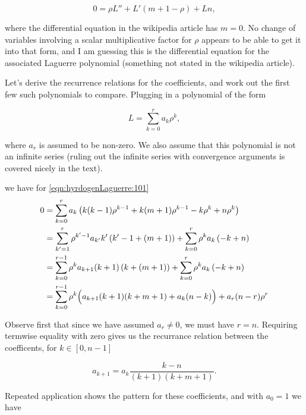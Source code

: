 \begin{equation}\label{eqn:hyrdogenLaguerre:101}
0 =
\rho L''
+L' \left( m + 1 -\rho \right)
+L n,
\end{equation}

where the differential equation in the wikipedia article has $m=0$.  No change of variables involving a scalar multiplicative factor for $\rho$ appears to be able to get it into that form, and I am guessing this is the differential equation for the associated Laguerre polynomial (something not stated in the wikipedia article).

Let's derive the recurrence relations for the coefficients, and work out the first few such polynomials to compare.  Plugging in a polynomial of the form

\begin{equation}\label{eqn:hyrdogenLaguerre:110}
L = \sum_{k=0}^r a_k \rho^{k},
\end{equation}

where $a_r$ is assumed to be non-zero.  We also assume that this polynomial is not an infinite series (ruling out the infinite series with convergence arguments is covered nicely in the text).

we have for \ref{eqn:hyrdogenLaguerre:101}
\begin{align*}
0 &= \sum_{k=0}^r a_k
\left(
k (k-1) \rho^{k-1}
+ k (m+1) \rho^{k-1}
- k \rho^{k}
+ n \rho^{k}
\right) \\
&=
\sum_{{k'}=1}^r
\rho^{{k'}-1}
a_{k'}
{k'} 
\left(
{k'}-1 
+
(m +1)
\right)
+\sum_{k=0}^r
\rho^{k}
a_k
\left(
-
 k 
+
 n 
\right) \\
&=
\sum_{{k}=0}^{r-1}
\rho^{k}
a_{k+1}
(k+1) 
\left(
k 
+
(m+1)
\right)
+\sum_{k=0}^r
\rho^{k}
a_k
\left(
-
 k 
+
 n 
\right) \\
&=
\sum_{{k}=0}^{r-1}
\rho^{k}
\Bigl(
a_{k+1} (k+1) (k + m + 1)
+a_k (n -k)
\Bigr)
+a_r (n-r) \rho^{r}
\end{align*}

Observe first that since we have assumed $a_r \ne 0$, we must have $r=n$.  Requiring termwise equality with zero gives us the recurrance relation between the coefficents, for $k \in [0,n-1]$

\begin{equation}\label{eqn:hyrdogenLaguerre:120}
a_{k+1} = a_k \frac{k - n}{ (k+1) (k + m + 1) }.
\end{equation}

Repeated application shows the pattern for these coefficients, and with $a_0=1$ we have

